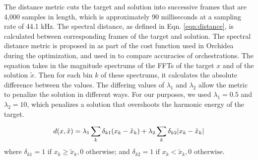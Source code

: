 \documentclass{article}
\begin{document}
    The distance metric cuts the target and solution into successive frames that are 4,000 samples in length, which is approximately 90 milliseconds at a sampling rate of 44.1 kHz. The spectral distance, as defined in Eqn. \ref{eqn:distance}, is calculated between corresponding frames of the target and solution. The spectral distance metric is proposed in \cite{Cella2020} as part of the cost function used in Orchidea during the optimization, and used in \cite{Cella2020b} to compare accuracies of orchestrations. The equation takes in the magnitude spectrums of the FFTs of the target $x$ and of the solution $\tilde{x}$. Then for each bin $k$ of these spectrums, it calculates the absolute difference between the values. The differing values of $\lambda_1$ and $\lambda_2$ allow the metric to penalize the solution in different ways. For our purposes, we used $\lambda_1 = 0.5$ and $\lambda_2 = 10$, which penalizes a solution that overshoots the harmonic energy of the target.
    
    \begin{equation}\label{eqn:distance}
d(x, \tilde{x}) =\lambda_1 \sum_k \delta_{k1}(x_k - \tilde{x}_k) + \lambda_2 \sum_k \delta_{k2}|x_k - \tilde{x  }_k| \\
\end{equation}
where $\delta_{k1} = 1 \text{  if  } x_k \ge \tilde{x}_k, 0 \text{  otherwise}$; and $\delta_{k2} = 1 \text{  if  } x_k < \tilde{x}_k, 0 \text{  otherwise}$.


%
  
\end{document}
